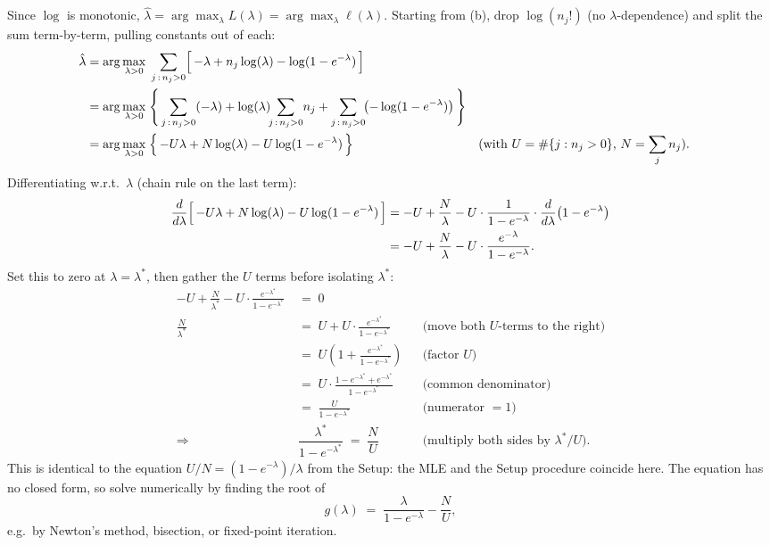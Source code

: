 \documentclass[11pt,a4paper]{article}
\newcommand{\hlam}{\hat{\lambda}}
\begin{document}
Since $\log$ is monotonic, $\hlam = \arg\max_\lambda L(\lambda) = \arg\max_\lambda \ell(\lambda)$.
Starting from (b), drop $\log(n_j!)$ (no $\lambda$-dependence) and split the sum
term-by-term, pulling constants out of each:
\begin{align*}
\hlam
  &= \arg\max_{\lambda > 0}\;
     \sum_{j\,:\,n_j > 0} \Bigl[\, -\lambda + n_j \log(\lambda) - \log(1 - e^{-\lambda}) \,\Bigr] \\
  &= \arg\max_{\lambda > 0}\;
     \Biggl\{\, \sum_{j\,:\,n_j>0}(-\lambda)
              + \log(\lambda)\!\!\sum_{j\,:\,n_j>0}\! n_j
              + \sum_{j\,:\,n_j>0}\!\bigl(-\log(1 - e^{-\lambda})\bigr) \,\Biggr\} \\
  &= \arg\max_{\lambda > 0}\;
     \Bigl\{\, -U\lambda + N \log(\lambda) - U \log(1 - e^{-\lambda}) \,\Bigr\}
     && \text{(with $U = \#\{j : n_j > 0\}$, $N = \sum_j n_j$).}
\end{align*}
Differentiating w.r.t.\ $\lambda$ (chain rule on the last term):
\begin{align*}
\frac{d}{d\lambda}\Bigl[\,-U\lambda + N \log(\lambda) - U \log(1 - e^{-\lambda})\,\Bigr]
  &= -U + \frac{N}{\lambda} - U \cdot \frac{1}{1 - e^{-\lambda}} \cdot \frac{d}{d\lambda}\bigl(1 - e^{-\lambda}\bigr) \\
  &= -U + \frac{N}{\lambda} - U \cdot \frac{e^{-\lambda}}{1 - e^{-\lambda}}.
\end{align*}
Set this to zero at $\lambda = \lambda^{\ast}$, then gather the $U$ terms before
isolating $\lambda^{\ast}$:
\begin{align*}
-U + \frac{N}{\lambda^{\ast}} - U \cdot \frac{e^{-\lambda^{\ast}}}{1 - e^{-\lambda^{\ast}}}
  &\;=\; 0 \\
\frac{N}{\lambda^{\ast}}
  &\;=\; U + U \cdot \frac{e^{-\lambda^{\ast}}}{1 - e^{-\lambda^{\ast}}}
     && \text{(move both $U$-terms to the right)} \\
  &\;=\; U\!\left( 1 + \frac{e^{-\lambda^{\ast}}}{1 - e^{-\lambda^{\ast}}} \right)
     && \text{(factor $U$)} \\
  &\;=\; U \cdot \frac{1 - e^{-\lambda^{\ast}} + e^{-\lambda^{\ast}}}{1 - e^{-\lambda^{\ast}}}
     && \text{(common denominator)} \\
  &\;=\; \frac{U}{1 - e^{-\lambda^{\ast}}}
     && \text{(numerator $= 1$)} \\
\Longrightarrow\quad
   & \boxed{\;\dfrac{\lambda^{\ast}}{1 - e^{-\lambda^{\ast}}} \;=\; \dfrac{N}{U}\;}
     && \text{(multiply both sides by $\lambda^{\ast}\!/U$).}
\end{align*}
This is identical to the equation $U/N = (1 - e^{-\lambda})/\lambda$ from the
Setup: the MLE and the Setup procedure coincide here. The equation has no
closed form, so solve numerically by finding the root of
\[
   g(\lambda) \;=\; \frac{\lambda}{1 - e^{-\lambda}} - \frac{N}{U},
\]
e.g.\ by Newton's method, bisection, or fixed-point iteration.
\end{document}
